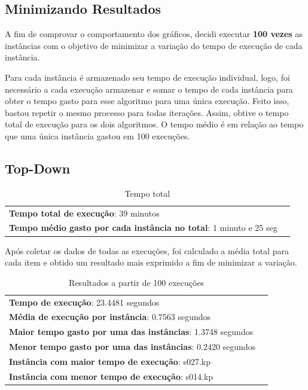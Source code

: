\documentclass[a4paper, 12pt]{article}
\begin{document}
\subsection{Minimizando Resultados}
A fim de comprovar o comportamento dos gráficos, decidi executar {\bf 100 vezes} as instâncias com o objetivo de minimizar
a variação do tempo de execução de cada instância.

Para cada instância é armazenado seu tempo de execução individual, logo, foi necessário a cada execução
armazenar e somar o tempo de cada instância para obter o tempo gasto para esse algoritmo para uma única execução. Feito isso, bastou
repetir o mesmo processo para todas iterações. Assim, obtive o tempo total de execução para os dois algoritmos. 
O tempo médio é em relação ao tempo que uma única instância gastou em 100 execuções.
\subsection{Top-Down}
\begin{table}[!htb]
    \begin{tabular}{ll}
        {\bf Tempo total de execução}: 39 minutos\\
        {\bf Tempo médio gasto por cada instância no total}: 1 minuto e 25 seg
    \end{tabular}
    \caption{Tempo total}
    \label{tab:total_topdown}
\end{table}

Após coletar os dados de todas as execuções, foi calculado a média total para cada item e obtido um resultado 
mais exprimido a fim de minimizar a variação.
\begin{table}[!htb]
    \begin{tabular}{ll}
        {\bf Tempo de execução}: 23.4481 segundos\\
        {\bf Média de execução por instância}: 0.7563 segundos\\
        {\bf Maior tempo gasto por uma das instâncias}: 1.3748 segundos\\
        {\bf Menor tempo gasto por uma das instâncias}: 0.2420 segundos \\
        {\bf Instância com maior tempo de execução}: s027.kp\\
        {\bf Instância com menor tempo de execução}: s014.kp
    \end{tabular}
    \caption{Resultados a partir de 100 execuções}
    \label{tab:result_tot_topdown}
\end{table}
\end{document}
